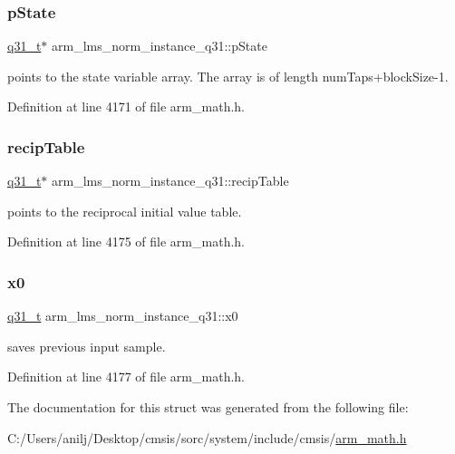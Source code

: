 \subsubsection{\texorpdfstring{p\+State}{pState}}
{\footnotesize\ttfamily \hyperlink{arm__math_8h_adc89a3547f5324b7b3b95adec3806bc0}{q31\+\_\+t}$\ast$ arm\+\_\+lms\+\_\+norm\+\_\+instance\+\_\+q31\+::p\+State}

points to the state variable array. The array is of length num\+Taps+block\+Size-\/1. 

Definition at line 4171 of file arm\+\_\+math.\+h.

\mbox{\label{structarm__lms__norm__instance__q31_a85836d0907077b9ac660f7bbbaa9d694}} 
\subsubsection{\texorpdfstring{recip\+Table}{recipTable}}
{\footnotesize\ttfamily \hyperlink{arm__math_8h_adc89a3547f5324b7b3b95adec3806bc0}{q31\+\_\+t}$\ast$ arm\+\_\+lms\+\_\+norm\+\_\+instance\+\_\+q31\+::recip\+Table}

points to the reciprocal initial value table. 

Definition at line 4175 of file arm\+\_\+math.\+h.

\mbox{\label{structarm__lms__norm__instance__q31_a47c4466d644e0d8ba407995adfa9b917}} 
\subsubsection{\texorpdfstring{x0}{x0}}
{\footnotesize\ttfamily \hyperlink{arm__math_8h_adc89a3547f5324b7b3b95adec3806bc0}{q31\+\_\+t} arm\+\_\+lms\+\_\+norm\+\_\+instance\+\_\+q31\+::x0}

saves previous input sample. 

Definition at line 4177 of file arm\+\_\+math.\+h.



The documentation for this struct was generated from the following file\+:\begin{DoxyCompactItemize}
\item 
C\+:/\+Users/anilj/\+Desktop/cmsis/sorc/system/include/cmsis/\hyperlink{arm__math_8h}{arm\+\_\+math.\+h}\end{DoxyCompactItemize}

